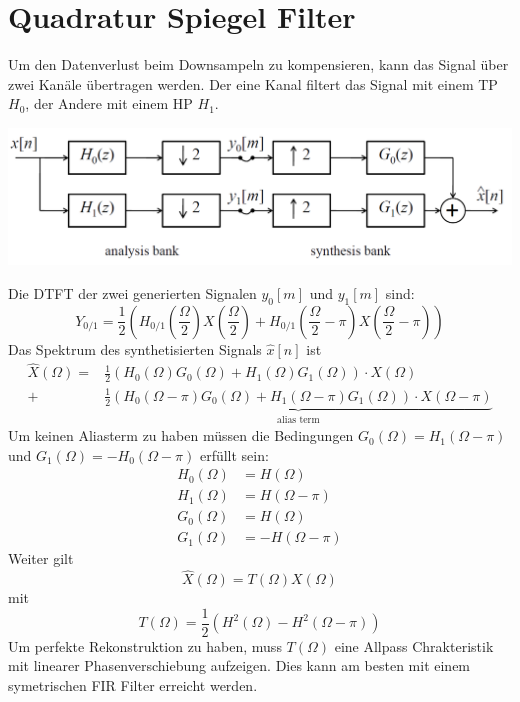 \section{Quadratur Spiegel Filter}
Um den Datenverlust beim Downsampeln zu kompensieren, kann das Signal über zwei
Kanäle übertragen werden. Der eine Kanal filtert das Signal mit einem TP $H_0$,
der Andere mit einem HP $H_1$.
\begin{center}
	\includegraphics[scale=.7]{../fig/quadrature_mirror}
\end{center}
Die DTFT der zwei generierten Signalen $y_0[m]$ und $y_1[m]$ sind:
\[ Y_{0/1} = \frac{1}{2} \left( H_{0/1}\left( \frac{\Omega}{2} \right)
	X\left( \frac{\Omega}{2} \right) + H_{0/1}\left( \frac{\Omega}{2} - \pi
	\right) X\left( \frac{\Omega}{2} -\pi\right) \right)\]
Das Spektrum des synthetisierten Signals $\hat{x}[n]$ ist
\[\begin{aligned} \hat{X}(\Omega) = &\frac12 \left( H_0(\Omega)G_0(\Omega)
	+ H_1(\Omega)G_1(\Omega) \right) \cdot X(\Omega) \\
	+ &\underbrace{\frac12 \left( H_0(\Omega-\pi)G_0(\Omega)
	+ H_1(\Omega-\pi)G_1(\Omega) \right) \cdot X(\Omega-\pi)}_
	{\textrm{alias term}} \end{aligned}\]
Um keinen Aliasterm zu haben müssen die Bedingungen $G_0(\Omega) = H_1(\Omega
-\pi)$ und $G_1(\Omega) = -H_0(\Omega-\pi)$ erfüllt sein:
\[\begin{aligned}
	H_0(\Omega) &= H(\Omega)\\
	H_1(\Omega) &= H(\Omega-\pi)\\
	G_0(\Omega) &= H(\Omega)\\
	G_1(\Omega) &= -H(\Omega-\pi)
\end{aligned}\]
Weiter gilt
\[ \hat{X}(\Omega) = T(\Omega)X(\Omega) \]
mit
\[ T(\Omega) = \frac{1}{2}(H^2(\Omega) -H^2(\Omega-\pi)) \]
Um perfekte Rekonstruktion zu haben, muss $T(\Omega)$ eine Allpass 
Chrakteristik mit linearer Phasenverschiebung aufzeigen. Dies kann am besten
mit einem symetrischen FIR Filter erreicht werden. 
